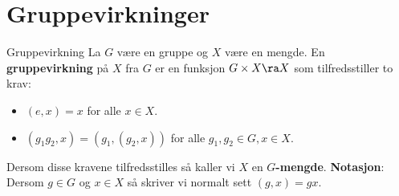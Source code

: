 \section{Gruppevirkninger}
\begin{definition}{Gruppevirkning}{}
	La $G$ være en gruppe og $X$ være en mengde. En \textbf{gruppevirkning} på $X$ fra
	$G$ er en funksjon $G\times X \ra X$ som tilfredsstiller to krav:
	\begin{itemize}
		\item $(e, x) = x$ for alle $x \in X$.
		\item $(g_1g_2, x) = (g_1, (g_2, x))$ for alle $g_1, g_2 \in G, x\in X$.
	\end{itemize}
	Dersom disse kravene tilfredsstilles så kaller vi $X$ en \textbf{$G$-mengde}.
	\newline\newline
	\textbf{Notasjon}: Dersom $g\in G$ og $x\in X$ så skriver vi normalt sett
	$(g, x) = gx$.
\end{definition}

